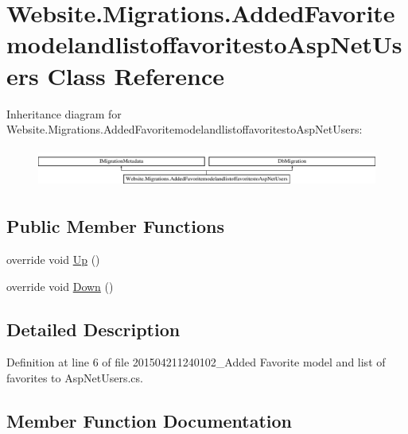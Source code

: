 \hypertarget{class_website_1_1_migrations_1_1_added_favoritemodelandlistoffavoritesto_asp_net_users}{}\section{Website.\+Migrations.\+Added\+Favoritemodelandlistoffavoritesto\+Asp\+Net\+Users Class Reference}
\label{class_website_1_1_migrations_1_1_added_favoritemodelandlistoffavoritesto_asp_net_users}
Inheritance diagram for Website.\+Migrations.\+Added\+Favoritemodelandlistoffavoritesto\+Asp\+Net\+Users\+:\begin{figure}[H]
\begin{center}
\leavevmode
\includegraphics[height=1.311475cm]{class_website_1_1_migrations_1_1_added_favoritemodelandlistoffavoritesto_asp_net_users}
\end{center}
\end{figure}
\subsection*{Public Member Functions}
\begin{DoxyCompactItemize}
\item 
override void \hyperlink{class_website_1_1_migrations_1_1_added_favoritemodelandlistoffavoritesto_asp_net_users_a11604e2c3363afec2d0400de5f5805e2}{Up} ()
\item 
override void \hyperlink{class_website_1_1_migrations_1_1_added_favoritemodelandlistoffavoritesto_asp_net_users_a2cada10be4e35011ee1115bdf2afb1fe}{Down} ()
\end{DoxyCompactItemize}


\subsection{Detailed Description}


Definition at line 6 of file 201504211240102\+\_\+\+Added Favorite model and list of favorites to Asp\+Net\+Users.\+cs.



\subsection{Member Function Documentation}
\hypertarget{class_website_1_1_migrations_1_1_added_favoritemodelandlistoffavoritesto_asp_net_users_a2cada10be4e35011ee1115bdf2afb1fe}{}
